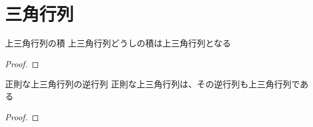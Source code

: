 \documentclass[../../../topic_linear-algebra]{subfiles}
\begin{document}
\sectionline
\section{三角行列}

\begin{theorem}{上三角行列の積}\label{thm:product-of-upper-triangular}
  上三角行列どうしの積は上三角行列となる
\end{theorem}

\begin{proof}
  \todo{}
\end{proof}

\br

\begin{theorem}{正則な上三角行列の逆行列}\label{thm:inverse-of-upper-triangular}
  正則な上三角行列は、その逆行列も上三角行列である
\end{theorem}

\begin{proof}
  \todo{}
\end{proof}
\end{document}
